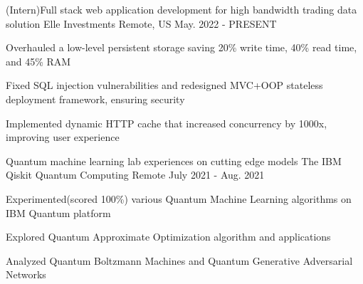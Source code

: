 \begin{cventries}
  \begin{comment}
  \cventry
    {Machine Learning \& Computation}
    {Chemical Molecular Energy Optimization}
    {Providence, RI}
    {Aug 2022 - Present}
    {
      \begin{cvitems}
        \item {Analyzed traditional Hartree-Fock and DFT methods with Gaussian}
        \item {Implemented the original data pipeline on Brown's Oscar super computing cluster with 200x speed}
        \item {Working on an efficient Belief Propagation network based on HMC}
      \end{cvitems}
    }
  \end{comment}
  \cventry
    {(Intern)Full stack web application development for high bandwidth trading data solution}
    {Elle Investments}
    {Remote, US}
    {May. 2022 - PRESENT}
    {
      \begin{cvitems}
        \item {Overhauled a low-level persistent storage saving 20\% write time, 40\% read time, and 45\% RAM}
        \item {Fixed SQL injection vulnerabilities and redesigned MVC+OOP stateless deployment framework, ensuring security}
        \item {Implemented dynamic HTTP cache that increased concurrency by 1000x, improving user experience}
      \end{cvitems}
    }

  \cventry
    {Quantum machine learning lab experiences on cutting edge models}
    {The IBM Qiskit Quantum Computing}
    {Remote}
    {July 2021 - Aug. 2021}
    {
      \begin{cvitems}
        \item {Experimented(scored 100\%) various Quantum Machine Learning algorithms on IBM Quantum platform}
        \item {Explored Quantum Approximate Optimization algorithm and applications}
        \item {Analyzed Quantum Boltzmann Machines and Quantum Generative Adversarial Networks}
      \end{cvitems}
    }


\end{cventries}
